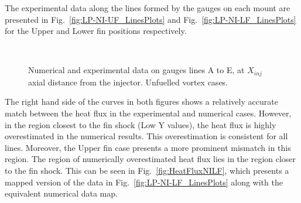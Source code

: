 \documentclass{AIAA}
\begin{document}
The experimental data along the lines formed by the gauges on each mount are presented in Fig.~\ref{fig:LP-NI-UF_LinesPlots} and Fig.~\ref{fig:LP-NI-LF_LinesPlots} for the Upper and Lower fin positions respectively.
\begin{figure}[!h]
\center
%
\\
\caption{Numerical and experimental data on gauges lines A to E, at $X_{inj}$ axial distance from the injector. Unfuelled vortex cases.}
\label{fig:HeatFluxVortex_Lines}
\end{figure} 

The right hand side of the curves in both figures shows a relatively accurate match between the heat flux in the experimental and numerical cases. However, in the region closest to the fin shock (Low Y values), the heat flux is highly overestimated in the numerical results. This overestimation is consistent for all lines. Moreover, the Upper fin case presents a more prominent mismatch in this region. The region of numerically overestimated heat flux lies in the region closer to the fin shock. This can be seen in Fig.~\ref{fig:HeatFluxNILF}, which presents a mapped version of the data in Fig.~\ref{fig:LP-NI-LF_LinesPlots} along with the equivalent numerical data map.
\end{document}
